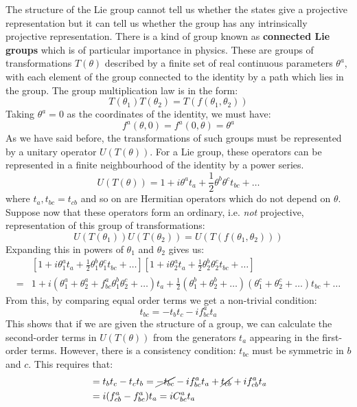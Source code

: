 \documentclass[../main.tex]{subfiles}
\begin{document}
The structure of the Lie group cannot tell us whether the states give a projective representation but it can tell us whether the group has any intrinsically projective representation. There is a kind of group known as \textbf{connected Lie groups} which is of particular importance in physics. These are groups of transformations $T(\theta)$ described by a finite set of real continuous parameters $\theta^a$, with each element of the group connected to the identity by a path which lies in the group. The group multiplication law is in the form:
\[
T(\theta_1)T(\theta_2)=T(f(\theta_1,\theta_2))
\]
Taking $\theta^a=0$ as the coordinates of the identity, we must have:
\[
f^a(\theta,0)=f^a(0,\theta)=\theta^a
\]
As we have said before, the transformations of such groups must be represented by a unitary operator $U(T(\theta))$. For a Lie group, these operators can be represented in a finite neighbourhood of the identity by a power series.
\[
U(T(\theta))=1+i\theta^at_a+\frac{1}{2}\theta^b\theta^ct_{bc}+\dots
\]
where $t_a, t_{bc}=t_{cb}$ and so on are Hermitian operators which do not depend on $\theta$. Suppose now that these operators form an ordinary, i.e. \textit{not} projective, representation of this group of transformations:
\[
U(T(\theta_1))U(T(\theta_2))=U(T(f(\theta_1,\theta_2)))
\]
Expanding this in powers of $\theta_1$ and $\theta_2$ gives us:
\begin{align*}
&\left[1+i\theta_1^at_a+\frac{1}{2}\theta_1^b\theta_1^ct_{bc}+\dots\right]\left[1+i\theta_2^at_a+\frac{1}{2}\theta_2^b\theta_2^ct_{bc}+\dots\right]\\
=&1+i(\theta_1^a+\theta_2^a+f^a_{bc}\theta_1^b\theta_2^c+\dots)t_a+\frac{1}{2}(\theta_1^b+\theta_2^b+\dots)(\theta_1^c+\theta_2^c+\dots)t_{bc}+\dots
\end{align*}
From this, by comparing equal order terms we get a non-trivial condition:
\[
t_{bc}=-t_bt_c-if^a_{bc}t_a
\]
This shows that if we are given the structure of a group, we can calculate the second-order terms in $U(T(\theta))$ from the generators $t_a$ appearing in the first-order terms. However, there is a consistency condition: $t_{bc}$ must be symmetric in $b$ and $c$. This requires that:
\begin{align*}
[t_b,t_c]&=t_bt_c-t_ct_b=\cancel{-t_{bc}}-if^a_{bc}t_a+\cancel{t_{cb}}+if^a_{cb}t_a\\
&=i(f_{cb}^a-f_{bc}^a)t_a=iC_{bc}^at_a
\end{align*}
\end{document}
